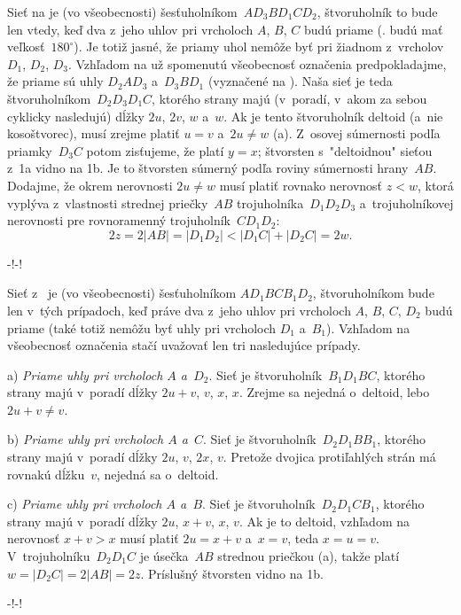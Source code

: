 {Sieť na  je (vo všeobecnosti) šesťuholníkom~$AD_3BD_1CD_2$,
štvoruholník to bude len vtedy, keď dva z~jeho uhlov
pri vrcholoch $A$, $B$, $C$ budú priame (\tj. budú mať veľkosť~$180^{\circ}$).
Je totiž jasné, že priamy uhol nemôže byť
pri žiadnom z~vrcholov $D_1$, $D_2$, $D_3$. Vzhľadom na už spomenutú
všeobecnosť označenia predpokladajme, že priame sú uhly $D_2AD_3$
a~$D_3BD_1$ (vyznačené na ). Naša sieť je teda
štvoruholníkom~$D_2D_3D_1C$, ktorého strany majú
(v~poradí, v~akom za sebou cyklicky nasledujú) dĺžky $2u$,
$2v$, $w$ a~$w$. Ak je tento štvoruholník deltoid (a~nie
kosoštvorec), musí zrejme platiť $u=v$ a~$2u\ne w$ (\obr a).
Z~osovej súmernosti podľa priamky~$D_3C$ potom zisťujeme,
že platí $y=x$; štvorsten s~"deltoidnou"
sieťou z~\obrr1a{} vidno na \obrr1b. Je to štvorsten súmerný
podľa roviny súmernosti hrany~$AB$.
Dodajme, že okrem nerovnosti $2u\ne w$ musí platiť
rovnako nerovnosť $z<w$, ktorá vyplýva z~vlastnosti strednej
priečky~$AB$ trojuholníka~$D_1D_2D_3$ a~trojuholníkovej nerovnosti
pre rovnoramenný trojuholník~$CD_1D_2$:
$$
2z=2|AB|=|D_1D_2|<|D_1C|+|D_2C|=2w.
$$

\midinsert
\centerline{\inspicture-!\hss\inspicture-!}
\endinsert

Sieť z~ je (vo všeobecnosti) šesťuholníkom $AD_1BCB_1D_2$,
štvoruholníkom bude len v~tých prípadoch, keď práve dva z~jeho
uhlov pri vrcholoch $A$, $B$, $C$, $D_2$ budú priame (také totiž
nemôžu byť uhly pri vrcholoch $D_1$ a~$B_1$). Vzhľadom na
všeobecnosť označenia stačí uvažovať len tri nasledujúce prípady.

a) {\it Priame uhly pri vrcholoch $A$ a~$D_2$}. Sieť je
štvoruholník~$B_1D_1BC$, ktorého strany majú v~poradí dĺžky $2u+v$,
$v$, $x$, $x$. Zrejme sa nejedná o~deltoid, lebo $2u+v\ne v$.

b) {\it Priame uhly pri vrcholoch $A$ a~$C$}. Sieť je štvoruholník~$D_2D_1BB_1$,
ktorého strany majú v~poradí dĺžky $2u$, $v$, $2x$,
$v$. Pretože dvojica protiľahlých strán má rovnakú dĺžku~$v$, nejedná
sa o~deltoid.

c) {\it Priame uhly pri vrcholoch $A$ a~$B$}. Sieť je štvoruholník~$D_2D_1CB_1$,
ktorého strany majú v~poradí dĺžky $2u$, $x+v$, $x$,
$v$. Ak je to deltoid, vzhľadom na nerovnosť $x+v>x$ musí
platiť $2u=x+v$ a~$x=v$, teda $x=u=v$. V~trojuholníku~$D_2D_1C$
je úsečka~$AB$ strednou priečkou (\obr a), takže platí
$w=|D_2C|=2|AB|=2z$. Príslušný štvorsten vidno na \obrr1b.

\midinsert
\centerline{\inspicture-!\hss\inspicture-!}
\endinsert

}
